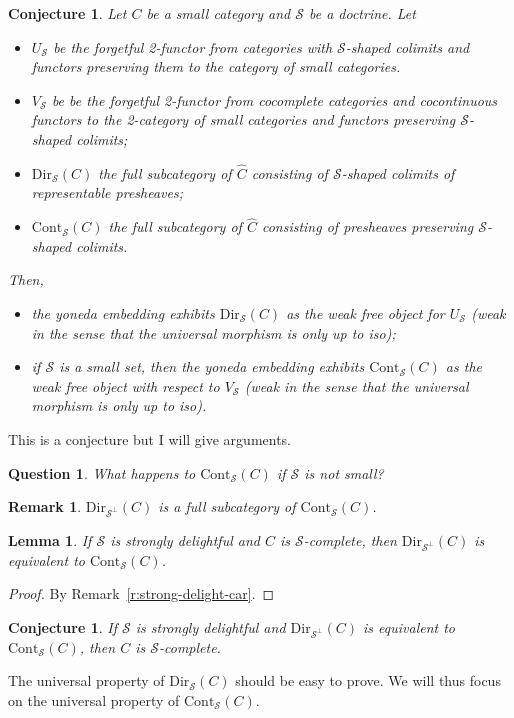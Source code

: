 \documentclass{article}
\newcommand{\Cont}[1]{\text{Cont}_{#1}}
\newcommand{\Dir}[1]{\text{Dir}_{#1}}
\newtheorem{conjecture}[theorem]{Conjecture}
\newtheorem{question}[theorem]{Question}
\newtheorem{remark}[theorem]{Remark}
\newtheorem{lemma}[theorem]{Lemma}
\begin{document}
\begin{conjecture}
  Let $C$ be a small category and
  $\mathcal{S}$ be a doctrine.
  Let
  \begin{itemize}
  \item $U_\mathcal{S}$ be the forgetful 2-functor from categories with $\mathcal{S}$-shaped colimits
    and functors preserving them to the category of small categories.
    \item $V_\mathcal{S}$ be
     be the forgetful 2-functor from cocomplete categories and cocontinuous
     functors to the 2-category of small categories and functors preserving $\mathcal{S}$-shaped
colimits;
\item $\Dir{\mathcal{S}}(C)$ the full subcategory of $\hat{C}$ consisting of
  $\mathcal{S}$-shaped colimits of representable presheaves;
\item $\Cont{\mathcal{S}}(C)$ the full subcategory of $\hat{C}$ consisting of
  presheaves preserving $\mathcal{S}$-shaped colimits.
  \end{itemize}
  Then,
  \begin{itemize}
  \item 
    the yoneda embedding exhibits $\Dir{\mathcal{S}}(C)$ as the weak free
    object for $U_\mathcal{S}$
    (weak in the sense that
    the universal morphism is only up to iso);
    \item
      if $\mathcal{S}$ is a small set, then 
      the yoneda embedding exhibits  $\Cont{\mathcal{S}}(C)$ as the
      weak free object with respect to $V_\mathcal{S}$ (weak in the sense that
      the universal morphism is only up to iso).
  \end{itemize}
\end{conjecture}
This is a conjecture but I will give arguments.
\begin{question}
What happens to $\Cont{\mathcal{S}}(C)$ if $\mathcal{S}$ is not small?
\end{question}
\begin{remark}
  $\Dir{\mathcal{S}^\bot}(C)$  is a full subcategory of $\Cont{\mathcal{S}}(C)$.
\end{remark}
\begin{lemma}
  If $\mathcal{S}$ is strongly delightful and $C$ is $\mathcal{S}$-complete, then
  $\Dir{\mathcal{S}^\bot}(C)$ is equivalent to $\Cont{\mathcal{S}}(C)$.
\end{lemma}
\begin{proof}
  By Remark~\ref{r:strong-delight-car}.
\end{proof}
\begin{conjecture}
  If $\mathcal{S}$ is strongly delightful and
  $\Dir{\mathcal{S}^\bot}(C)$ is equivalent to $\Cont{\mathcal{S}}(C)$, then
  $C$ is $\mathcal{S}$-complete.
\end{conjecture}
  The universal property of $\Dir{\mathcal{S}}(C)$ should be easy to prove.
  We will thus focus on the universal property of $\Cont{\mathcal{S}}(C)$.
\end{document}
